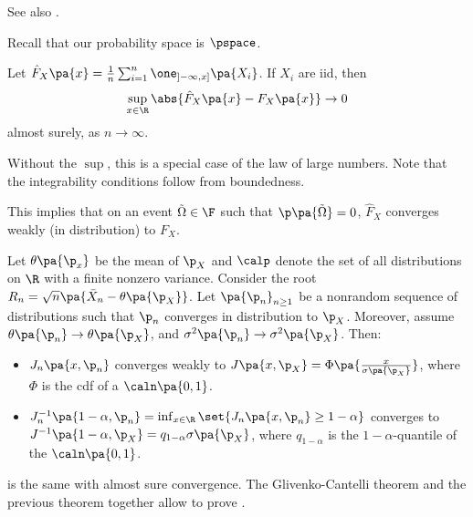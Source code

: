 \newpage
{}
See also \cite{lehmann2005testing}.

Recall that our probability space is $\pspace$.

\begin{theorem}
  Let $\hat{F}_X\pa{x} = \frac{1}{n} \sum_{i=1}^n \one_{]-\infty,x]}\pa{X_i}$. If $X_i$ are iid, then
  \begin{equation}
    \sup_{x\in \R} \abs{\hat{F}_X\pa{x} - F_X\pa{x}}\rightarrow 0
  \end{equation}
  almost surely, as $n\rightarrow \infty$.
\end{theorem}
Without the $\sup$, this is a special case of the law of large numbers. Note that the integrability conditions follow from boundedness.

This implies that on an event $\tilde{\Omega}\in \F$ such that $\p\pa{\tilde{\Omega}}=0$, $\hat{F}_X$ converges weakly (in distribution) to $F_X$.

\begin{theorem}
 Let $\theta\pa{\p_x}$ be the mean of $\p_X$ and $\calp$ denote the set of all distributions on $\R$ with a finite nonzero variance. Consider the root $R_n = \sqrt{n}\pa{\bar{X}_n - \theta\pa{\p_X}}$. Let $\pa{\p_n}_{n\geq 1}$ be a nonrandom sequence of distributions such that $\p_n$ converges in distribution to $\p_X$. Moreover, assume $\theta\pa{\p_n}\rightarrow \theta\pa{\p_X}$, and $\sigma^2\pa{\p_n}\rightarrow \sigma^2\pa{\p_X}$. Then:
 \begin{itemize}
   \item $J_n \pa{x,\p_n}$ converges weakly to $J\pa{x,\p_X} = \Phi \pa{\frac{x}{\sigma\pa{\p_X}}}$, where $\Phi$ is the cdf of a $\caln\pa{0,1}$.
   \item $J_n^{-1}\pa{1-\alpha, \p_n} = \inf_{x\in \R} \set{J_n \pa{x,\p_n}\geq 1-\alpha}$ converges to $J^{-1}\pa{1-\alpha,\p_X} = q_{1-\alpha} \sigma \pa{\p_X}$, where $q_{1-\alpha}$ is the $1-\alpha$-quantile of the $\caln\pa{0,1}$.
 \end{itemize}
\end{theorem}

 is the same with almost sure convergence. The Glivenko-Cantelli theorem and the previous theorem together allow to prove .

